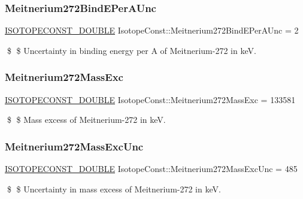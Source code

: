 \subsubsection{\texorpdfstring{Meitnerium272\+Bind\+E\+Per\+A\+Unc}{Meitnerium272BindEPerAUnc}}
{\footnotesize\ttfamily \mbox{\hyperlink{group___isotope_const-_macros_ga8f45a7272ce02c0b4c65c44636ed719a}{I\+S\+O\+T\+O\+P\+E\+C\+O\+N\+S\+T\+\_\+\+D\+O\+U\+B\+LE}} Isotope\+Const\+::\+Meitnerium272\+Bind\+E\+Per\+A\+Unc = 2}

\$ \$ Uncertainty in binding energy per A of Meitnerium-\/272 in keV. \mbox{\label{group___isotope_const-_meitnerium-_mt272_ga2e221b5ddfa41c47b3e193c8ceecf911}} 
\subsubsection{\texorpdfstring{Meitnerium272\+Mass\+Exc}{Meitnerium272MassExc}}
{\footnotesize\ttfamily \mbox{\hyperlink{group___isotope_const-_macros_ga8f45a7272ce02c0b4c65c44636ed719a}{I\+S\+O\+T\+O\+P\+E\+C\+O\+N\+S\+T\+\_\+\+D\+O\+U\+B\+LE}} Isotope\+Const\+::\+Meitnerium272\+Mass\+Exc = 133581}

\$ \$ Mass excess of Meitnerium-\/272 in keV. \mbox{\label{group___isotope_const-_meitnerium-_mt272_ga5fa841df56ca7fec72480efc6c14938b}} 
\subsubsection{\texorpdfstring{Meitnerium272\+Mass\+Exc\+Unc}{Meitnerium272MassExcUnc}}
{\footnotesize\ttfamily \mbox{\hyperlink{group___isotope_const-_macros_ga8f45a7272ce02c0b4c65c44636ed719a}{I\+S\+O\+T\+O\+P\+E\+C\+O\+N\+S\+T\+\_\+\+D\+O\+U\+B\+LE}} Isotope\+Const\+::\+Meitnerium272\+Mass\+Exc\+Unc = 485}

\$ \$ Uncertainty in mass excess of Meitnerium-\/272 in keV. \mbox{\label{group___isotope_const-_meitnerium-_mt272_ga5a812c7ceff9ef53ac544067bac2d4d1}} 
